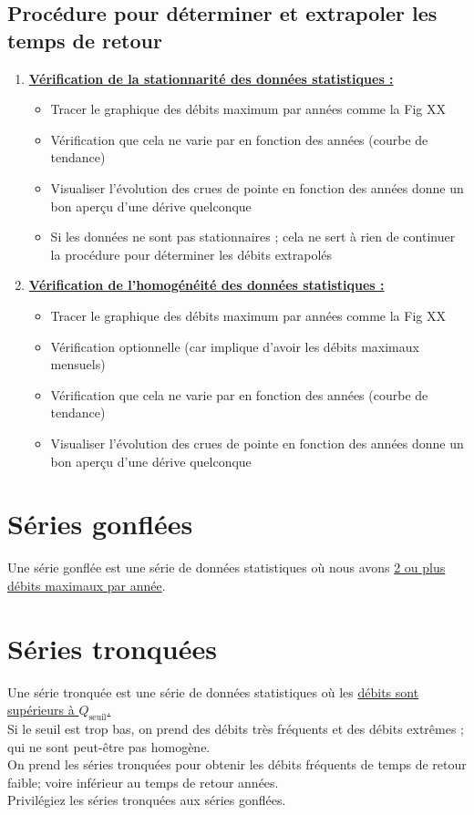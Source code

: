 \subsection{Procédure pour déterminer et extrapoler les temps de retour}
\begin{enumerate}
    \item \textbf{\underline{Vérification de la stationnarité des données statistiques :}} \\
    \begin{itemize}
        \item Tracer le graphique des débits maximum par années comme la Fig XX
        \item Vérification que cela ne varie par en fonction des années (courbe de tendance)
        \item Visualiser l'évolution des crues de pointe en fonction des années donne un bon aperçu d'une dérive quelconque
        \item \Warning Si les données ne sont pas stationnaires ; cela ne sert à rien de continuer la procédure pour déterminer les débits extrapolés
    \end{itemize}
    \bigskip
    \item \textbf{\underline{Vérification de l'homogénéité des données statistiques :}}
    \begin{itemize}
        \item Tracer le graphique des débits maximum par années comme la Fig XX
        \item Vérification optionnelle (car implique d'avoir les débits maximaux mensuels)
        \item Vérification que cela ne varie par en fonction des années (courbe de tendance)
        \item Visualiser l'évolution des crues de pointe en fonction des années donne un bon aperçu d'une dérive quelconque
    \end{itemize}
\end{enumerate}

\section{Séries gonflées}
Une série gonflée est une série de données statistiques où nous avons \underline{2 ou plus débits maximaux par année}.

\section{Séries tronquées}
Une série tronquée est une série de données statistiques où les \underline{débits sont supérieurs à $Q_\text{seuil}$.} \\
\Warning Si le seuil est trop bas, on prend des débits très fréquents et des débits extrêmes ; qui ne sont peut-être pas homogène. \\
On prend les séries tronquées pour obtenir les débits fréquents de temps de retour faible; voire inférieur au temps de retour années. \\
Privilégiez les séries tronquées aux séries gonflées.